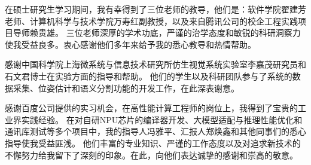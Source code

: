 
\begin{acknowledgements}

	\par 在硕士研究生学习期间，我有幸得到了三位老师的教导，他们是：软件学院翟建芳老师、计算机科学与技术学院万寿红副教授，以及来自腾讯公司的校企工程实践项目导师赖贵雄。
	三位老师深厚的学术功底，严谨的治学态度和敏锐的科研洞察力使我受益良多。衷心感谢他们多年来给予我的悉心教导和热情帮助。

	\par 感谢中国科学院上海微系统与信息技术研究所仿生视觉系统实验室李嘉茂研究员和石文君博士在实验方面的指导和帮助。
	他们的学生以及科研团队参与了系统的数据采集、位姿估计和语义分割功能的开发工作，在此深表谢意。
	
	\par 感谢百度公司提供的实习机会，在高性能计算工程师的岗位上，我得到了宝贵的工业界实践经验。
	在对自研NPU芯片的编译器开发、大模型适配与推理性能优化和通讯库测试等多个项目中，我的指导人冯雅平、汇报人郑焕鑫和其他同事们的悉心指导使我受益匪浅。
	他们丰富的专业知识、严谨的工作态度以及对追求新技术的不懈努力给我留下了深刻的印象。在此，向他们表达诚挚的感谢和崇高的敬意。
	
\end{acknowledgements}
